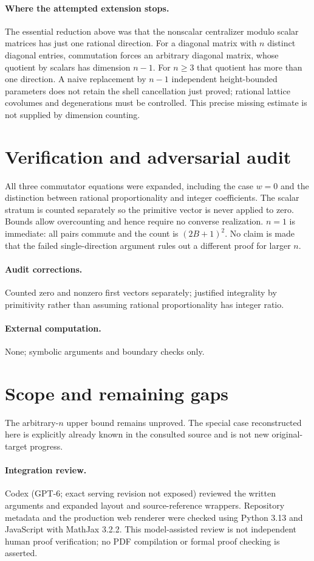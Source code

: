 \documentclass[11pt]{article}
\begin{document}
\paragraph{Where the attempted extension stops.}
The essential reduction above was that the nonscalar centralizer modulo scalar matrices has just one rational direction. For a diagonal matrix with $n$ distinct diagonal entries, commutation forces an arbitrary diagonal matrix, whose quotient by scalars has dimension $n-1$. For $n\geq3$ that quotient has more than one direction. A naive replacement by $n-1$ independent height-bounded parameters does not retain the shell cancellation just proved; rational lattice covolumes and degenerations must be controlled. This precise missing estimate is not supplied by dimension counting.
\section{Verification and adversarial audit}
All three commutator equations were expanded, including the case $w=0$ and the distinction between rational proportionality and integer coefficients. The scalar stratum is counted separately so the primitive vector is never applied to zero. Bounds allow overcounting and hence require no converse realization. $n=1$ is immediate: all pairs commute and the count is $(2B+1)^2$. No claim is made that the failed single-direction argument rules out a different proof for larger $n$.
\paragraph{Audit corrections.} Counted zero and nonzero first vectors separately; justified integrality by primitivity rather than assuming rational proportionality has integer ratio.
\paragraph{External computation.} None; symbolic arguments and boundary checks only.
\section{Scope and remaining gaps}
The arbitrary-$n$ upper bound remains unproved. The special case reconstructed here is explicitly already known in the consulted source and is not new original-target progress.
\paragraph{Integration review.} Codex (GPT-6; exact serving revision not exposed) reviewed the written arguments and expanded layout and source-reference wrappers. Repository metadata and the production web renderer were checked using Python 3.13 and JavaScript with MathJax 3.2.2. This model-assisted review is not independent human proof verification; no PDF compilation or formal proof checking is asserted.
\end{document}
